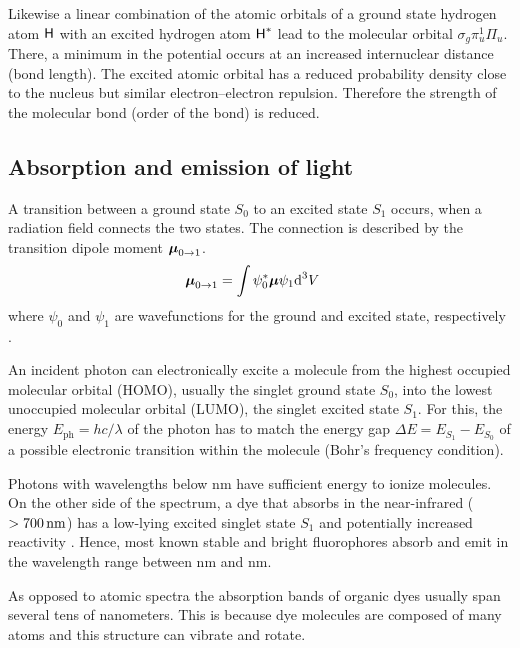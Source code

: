 Likewise a linear combination of the atomic orbitals of a ground state
hydrogen atom $\textsf{H}$ with an excited hydrogen atom $\textsf{H}^*$ lead to the
molecular orbital $\sigma_g\pi_u^1\Pi_u$. There, a minimum in the
potential occurs at an increased internuclear distance (bond
length). The excited atomic orbital has a reduced probability density
close to the nucleus but similar electron--electron
repulsion. Therefore the strength of the molecular bond (order of the
bond) is reduced.
\newcommand{\vmu}{\mbox{\boldmath{$\mu$}}}
\subsection{Absorption and emission of light}
A transition between a ground state $S_0$ to an excited state $S_1$
occurs, when a radiation field connects the two states. The connection
is described by the transition dipole moment
$\vmu_{0\rightarrow 1}$.
\begin{align}
  \vmu_{0\rightarrow 1} &= \int \psi^*_0 \vmu \psi_1 \textrm{d}^3V
\end{align}
where $\psi_0$ and $\psi_1$ are wavefunctions for the ground and
excited state, respectively \citep{Linde2011a}.

An incident photon can electronically excite a molecule from the
highest occupied molecular orbital (HOMO), usually the singlet ground
state $S_0$, into the lowest unoccupied molecular orbital (LUMO), the
singlet excited state $S_1$. For this, the energy $E_\textrm{ph}=hc/\lambda$ of the
photon has to match the energy gap $\Delta E=E_{S_1}-E_{S_0}$ of a
possible electronic transition within the molecule (Bohr's frequency
condition).

Photons with wavelengths below \unit[200]{nm} have sufficient energy
to ionize molecules. On the other side of the spectrum, a dye that
absorbs in the near-infrared ($\unit[>700]{nm}$) has a low-lying
excited singlet state $S_1$ and potentially increased reactivity
\citep{Sauer2011}. Hence, most known stable and bright fluorophores
absorb and emit in the wavelength range between \unit[300]{nm} and
\unit[700]{nm}.

As opposed to atomic spectra the absorption bands of organic dyes
usually span several tens of nanometers. This is because dye molecules
are composed of many atoms and this structure can vibrate and rotate.
